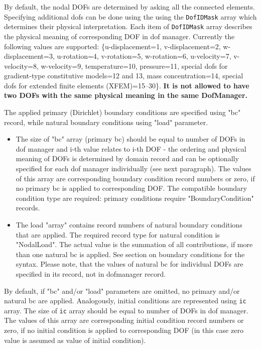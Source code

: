 \documentclass[a4paper]{article}
\newcommand{\param}[1]{\texttt{#1}} %
\begin{document}
By default, the nodal DOFs are determined by asking all the connected elements. Specifying additional dofs can be done using the using the \param{DofIDMask} array which determines their physical interpretation.
Each item of \param{DofIDMask} array describes the physical meaning of corresponding DOF in dof manager. Currently the following values are supported: \{u-displacement=1, v-displacement=2, w-displacement=3, u-rotation=4, v-ro\-ta\-tion=5, w-rotation=6, u-velocity=7, v-velocity=8, w-velocity=9, temperature=10, pressure=11, special dofs for gradient-type constitutive models=12 and 13, mass concentration=14, special dofs for extended finite elements (XFEM)=15--30\}.
\textbf{It is not allowed to have two DOFs with the same physical meaning in the same DofManager.}

The applied primary (Dirichlet) boundary conditions are specified using
"bc" record, while natural boundary conditions using "load" parameter.
\begin{itemize}
\item The size of "bc" array (primary bc) should be equal to number of DOFs in dof manager and i-th value relates to i-th DOF - the ordering and physical meaning of DOFs is determined by domain record and can be optionally specified for each dof manager individually (see next paragraph). The values of this array are corresponding boundary condition record numbers or zero, if no primary bc is applied to corresponding DOF. The compatible boundary condition type are required: primary conditions require "BoundaryCondition" records.
\item The load "array" contains record numbers of natural boundary conditions that are applied. The required record type for natural condition is "NodalLoad". The actual value is the summation of all contributions, if more than one natural bc is applied. See section on boundary conditions for the syntax. Please note, that the values of natural bc for individual DOFs are specified in its record, not in dofmanager record.
\end{itemize}

By default, if "bc" and/or "load" parameters are omitted, no primary and/or natural bc are applied. Analogously, initial conditions are represented using \param{ic} array. The size of \param{ic} array should be equal to number of DOFs in dof manager. The values of this array are corresponding initial condition record numbers or zero, if no initial condition is applied to corresponding DOF (in this case zero value is assumed as value of initial condition).
\end{document}
